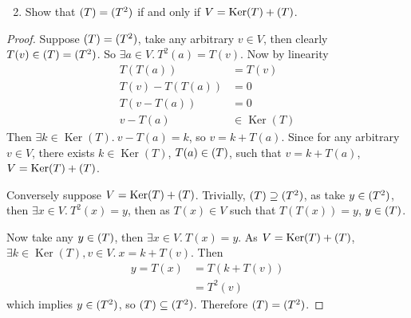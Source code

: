 \documentclass{article}
\theoremstyle{definition}
\numberwithin{lemma}{problem}
\numberwithin{equation}{problem}
\let\Im\relax
\DeclareMathOperator{\Im}{Im}
\DeclareMathOperator{\Ker}{Ker}
\begin{document}
\begin{enumerate}[label=(\alph*)] \setcounter{enumi}{1}
    \item Show that $\Im(T) = \Im(T^2)$ if and only if
        $V = \Ker(T) + \Im(T)$.
\end{enumerate}
\begin{proof}
    Suppose $\Im(T) = \Im(T^2)$,
    take any arbitrary $v\in V$,
    then clearly $T(v) \in \Im(T) = \Im(T^2)$.
    So $\exists a\in V.~ T^2(a) = T(v)$.
    Now by linearity
    \begin{align*}
        T(T(a)) &= T(v)\\
        T(v) - T(T(a)) &= 0\\
        T(v - T(a)) &= 0    \\
        v - T(a) &\in \Ker(T)
    \end{align*}
    Then $\exists k\in\Ker(T).~ v - T(a) = k$, so $v = k + T(a)$.
    Since for any arbitrary $v\in V$, there exists $k\in \Ker(T)$, $T(a)\in \Im(T)$,
    such that $v = k + T(a)$, $V = \Ker(T) + \Im(T)$.

    Conversely suppose $V = \Ker(T) + \Im(T)$.
    Trivially, $\Im(T) \supseteq \Im(T^2)$, as
    take $y\in \Im(T^2)$, then $\exists x\in V.~ T^2(x) = y$, then as $T(x)\in V$ such that $T(T(x)) = y$, $y\in \Im(T)$.

    Now take any $y\in \Im(T)$, then $\exists x\in V.~ T(x) = y$.
    As $V = \Ker(T) + \Im(T)$, $\exists k\in \Ker(T), v\in V.~ x = k + T(v)$.
    Then
    \begin{align*}
        y = T(x)&= T(k+T(v))\\
        &= T^2(v)
    \end{align*}
    which implies $y\in \Im(T^2)$, so $\Im(T) \subseteq \Im(T^2)$.
    Therefore $\Im(T) = \Im(T^2)$.
\end{proof}
\end{document}
